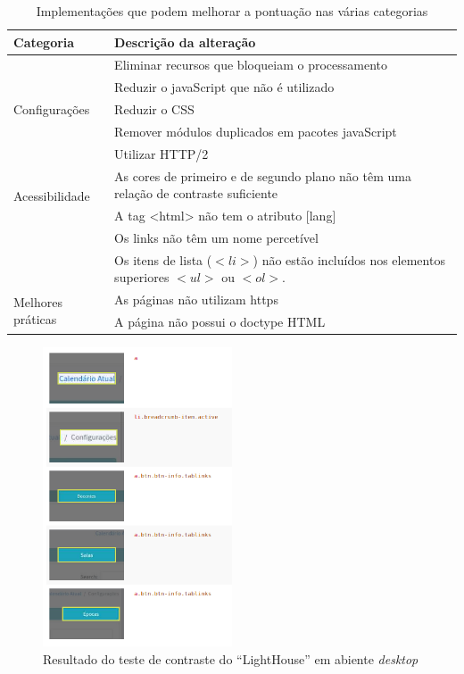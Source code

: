\documentclass[11pt, twoside]{report}
\begin{document}
		 	\begin{center}
		 	\label{upScoreTesting}
		 	\begin{longtable}{|m{2.2cm}|m{12cm}|}
		 		\caption{Implementações que podem melhorar a pontuação nas várias categorias}\\
		 		
		 		\hline			
		 		\textbf{Categoria}&\textbf{Descrição da alteração} \\
		 		\hline
		 		
		 		\multirow{5}{2cm}{Configurações}& Eliminar recursos que bloqueiam o processamento \\
		 		
		 		& Reduzir o javaScript que não é utilizado \\
		 		
		 		&Reduzir o CSS \\
		 		
		 		&Remover módulos duplicados em pacotes javaScript\\
		 		
		 		&Utilizar HTTP/2\\
		 		\hline
		 		\multirow{2}{2cm}{Acessibilidade}& As cores de primeiro e de segundo plano não têm uma relação de contraste suficiente \\
		 		&A tag <html> não tem o atributo [lang]\\
		 		&Os links não têm um nome percetível\\
		 		&Os itens de lista ($<li>$) não estão incluídos nos elementos superiores $<ul>$ ou $<ol>$.\\
		 		\hline
		 		\multirow{2}{2cm}{Melhores práticas} & As páginas não utilizam https\\
		 		&A página não possui o doctype HTML\\
		 		\hline
		 	\end{longtable}
		 \end{center}
		 
		 \begin{figure}[H] 
		 	\centering 							\includegraphics[width=0.5\textwidth,height=0.5\textheight,keepaspectratio]{image/acessibilityTests/contrast}
		 	\caption{Resultado do teste de contraste do ``LightHouse'' em abiente \textit{desktop}}
		 	\label{testContrast}
		 \end{figure}
	
\end{document}
